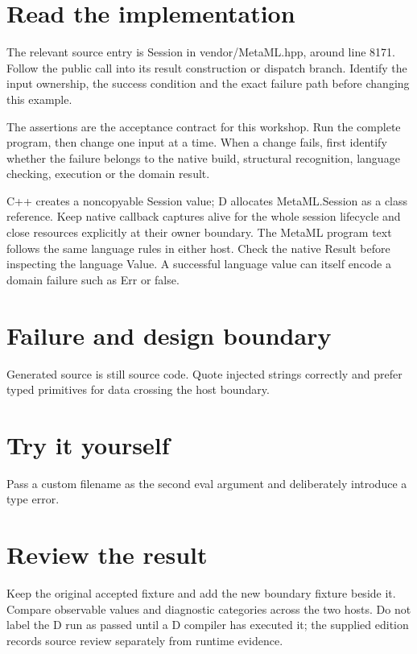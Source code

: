 \section*{Read the implementation}
The relevant source entry is Session in vendor/MetaML.hpp, around line 8171. Follow the public call into its result construction or dispatch branch. Identify the input ownership, the success condition and the exact failure path before changing this example.

The assertions are the acceptance contract for this workshop. Run the complete program, then change one input at a time. When a change fails, first identify whether the failure belongs to the native build, structural recognition, language checking, execution or the domain result.

\clearpage
{}
C++ creates a noncopyable Session value; D allocates MetaML.Session as a class reference. Keep native callback captures alive for the whole session lifecycle and close resources explicitly at their owner boundary. The MetaML program text follows the same language rules in either host. Check the native Result before inspecting the language Value. A successful language value can itself encode a domain failure such as Err or false.


\section*{Failure and design boundary}
Generated source is still source code. Quote injected strings correctly and prefer typed primitives for data crossing the host boundary.

\section*{Try it yourself}
Pass a custom filename as the second eval argument and deliberately introduce a type error.

\section*{Review the result}
Keep the original accepted fixture and add the new boundary fixture beside it. Compare observable values and diagnostic categories across the two hosts. Do not label the D run as passed until a D compiler has executed it; the supplied edition records source review separately from runtime evidence.

